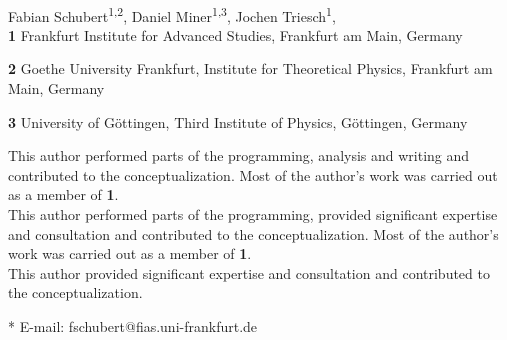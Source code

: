 \documentclass[10pt,letterpaper]{article}
\date{}
\begin{document}
\vspace*{0.2in}

\begin{flushleft}
{\Large
\textbf{} %
}
\newline
\\
Fabian Schubert\textsuperscript{1,2\Yinyang *},
Daniel Miner\textsuperscript{1,3\ddag},
Jochen Triesch\textsuperscript{1\dag},
\\
\bigskip
\textbf{1} Frankfurt Institute for Advanced Studies, Frankfurt am Main, Germany

\textbf{2} Goethe University Frankfurt, Institute for Theoretical Physics, Frankfurt am Main, Germany

\textbf{3} University of Göttingen, Third Institute of Physics, Göttingen, Germany
\\
\bigskip

% 
%
\Yinyang This author performed parts of the programming, analysis and writing and contributed to the conceptualization. Most of the author's work was carried out as a member of \textbf{1}.\\
\ddag This author performed parts of the programming, provided significant expertise and consultation and contributed to the conceptualization. Most of the author's work was carried out as a member of \textbf{1}.\\

\dag This author provided significant expertise and consultation and contributed to the conceptualization.

* E-mail: fschubert@fias.uni-frankfurt.de

\end{flushleft}
\end{document}
